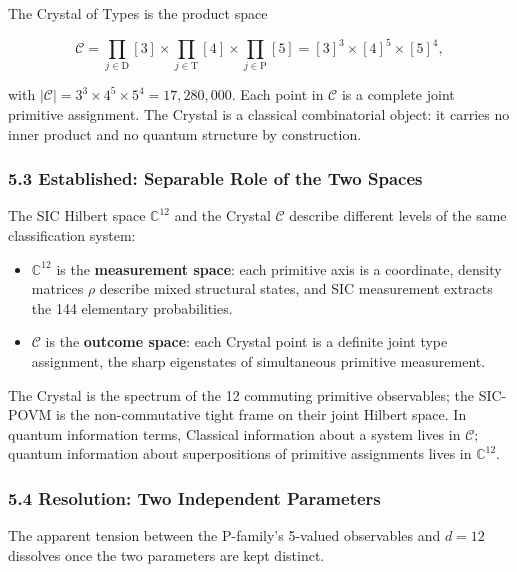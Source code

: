 The Crystal of Types is the product space

\[\mathcal{C} = \prod_{j \in \mathrm{D}} [3] \times \prod_{j \in \mathrm{T}} [4] \times \prod_{j \in \mathrm{P}} [5] = [3]^3 \times [4]^5 \times [5]^4,\]

with \(|\mathcal{C}| = 3^3 \times 4^5 \times 5^4 = 17{,}280{,}000\).
Each point in \(\mathcal{C}\) is a complete joint primitive assignment.
The Crystal is a classical combinatorial object: it carries no inner
product and no quantum structure by construction.

\hypertarget{established-separable-role-of-the-two-spaces}{%
\subsubsection{5.3 Established: Separable Role of the Two
Spaces}\label{established-separable-role-of-the-two-spaces}}

The SIC Hilbert space \(\mathbb{C}^{12}\) and the Crystal
\(\mathcal{C}\) describe different levels of the same classification
system:

\begin{itemize}
\tightlist
\item
  \(\mathbb{C}^{12}\) is the \textbf{measurement space}: each primitive
  axis is a coordinate, density matrices \(\rho\) describe mixed
  structural states, and SIC measurement extracts the 144 elementary
  probabilities.
\item
  \(\mathcal{C}\) is the \textbf{outcome space}: each Crystal point is a
  definite joint type assignment, the sharp eigenstates of simultaneous
  primitive measurement.
\end{itemize}

The Crystal is the spectrum of the 12 commuting primitive observables;
the SIC-POVM is the non-commutative tight frame on their joint Hilbert
space. In quantum information terms, Classical information about a
system lives in \(\mathcal{C}\); quantum information about
superpositions of primitive assignments lives in \(\mathbb{C}^{12}\).

\hypertarget{resolution-two-independent-parameters}{%
\subsubsection{5.4 Resolution: Two Independent
Parameters}\label{resolution-two-independent-parameters}}

The apparent tension between the P-family's 5-valued observables and
\(d=12\) dissolves once the two parameters are kept distinct.

